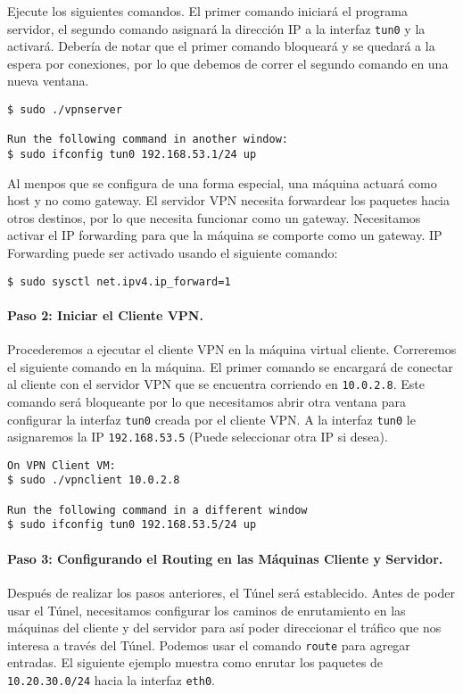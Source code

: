 Ejecute los siguientes comandos. El primer comando iniciará el programa servidor, el segundo comando asignará la dirección IP a la interfaz \texttt{tun0} y la activará. Debería de notar que el primer comando bloqueará y se quedará a la espera por conexiones, por lo que debemos de correr el segundo comando en una nueva ventana.


\begin{lstlisting}
$ sudo ./vpnserver

Run the following command in another window:
$ sudo ifconfig tun0 192.168.53.1/24 up
\end{lstlisting}

Al menpos que se configura de una forma especial, una máquina actuará como host y no como gateway. El servidor VPN necesita forwardear los paquetes hacia otros destinos, por lo que necesita funcionar como un gateway. Necesitamos activar el IP forwarding para que la máquina se comporte como un gateway.
IP Forwarding puede ser activado usando el siguiente comando:


\begin{lstlisting}
$ sudo sysctl net.ipv4.ip_forward=1
\end{lstlisting}



\paragraph{Paso 2: Iniciar el Cliente VPN.} 
Procederemos a ejecutar el cliente VPN en la máquina virtual cliente. Correremos el siguiente comando en la máquina. El primer comando se encargará de conectar al cliente con el servidor VPN que se encuentra corriendo en {\tt 10.0.2.8}. Este comando será bloqueante por lo que necesitamos abrir otra ventana para configurar la interfaz \texttt{tun0} creada por el cliente VPN.
A la interfaz \texttt{tun0} le asignaremos la IP \texttt{192.168.53.5} (Puede seleccionar otra IP si desea).


\begin{lstlisting}
On VPN Client VM:
$ sudo ./vpnclient 10.0.2.8

Run the following command in a different window
$ sudo ifconfig tun0 192.168.53.5/24 up
\end{lstlisting}



\paragraph{Paso 3: Configurando el Routing en las Máquinas Cliente y Servidor.}
Después de realizar los pasos anteriores, el Túnel será establecido.
Antes de poder usar el Túnel, necesitamos configurar los caminos de enrutamiento en las máquinas del cliente y del servidor para así poder direccionar el tráfico que nos interesa a través del Túnel.
Podemos usar el comando \texttt{route} para agregar entradas. El siguiente ejemplo muestra como enrutar los paquetes de \texttt{10.20.30.0/24} hacia la interfaz \texttt{eth0}.


